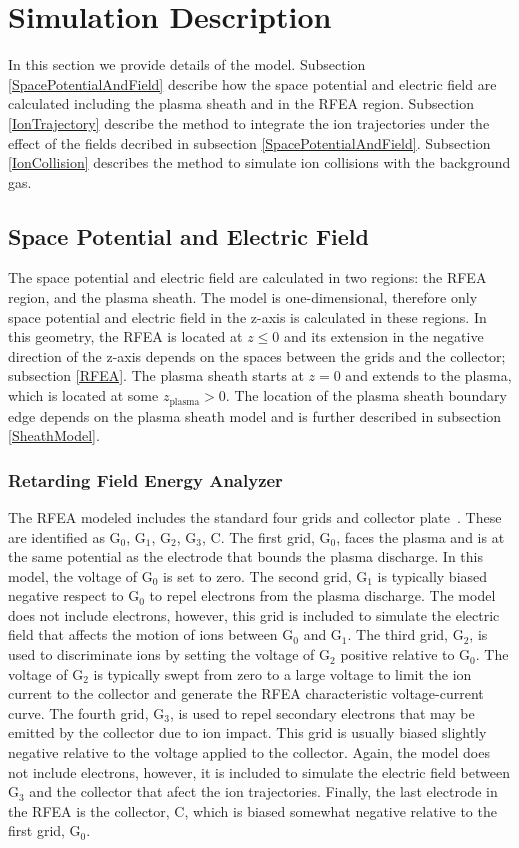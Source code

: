 \section{\label{Simulation}Simulation Description}
In this section we provide details of the model. Subsection \ref{SpacePotentialAndField} describe how the space potential and electric field are calculated including the plasma sheath and in the RFEA region. Subsection \ref{IonTrajectory} describe the method to integrate the ion trajectories under the effect of the fields decribed in subsection \ref{SpacePotentialAndField}. Subsection \ref{IonCollision} describes the method to simulate ion collisions with the background gas. 

\subsection{\label{SpacePotentialAndField}Space Potential and Electric Field}
The space potential and electric field are calculated in two regions: the RFEA region, and the plasma sheath. The model is one-dimensional, therefore only space potential and electric field in the z-axis is calculated in these regions. In this geometry, the RFEA is located at $z \leq 0$ and its extension in the negative direction of the z-axis depends on the spaces between the grids and the collector; subsection \ref{RFEA}. The plasma sheath starts at $z=0$ and extends to the plasma, which is located at some $z_\text{plasma} > 0$. The location of the plasma sheath boundary edge depends on the plasma sheath model and is further described in subsection \ref{SheathModel}.   

\subsubsection{\label{RFEA}Retarding Field Energy Analyzer}
The RFEA modeled includes the standard four grids and collector plate~\cite{Hutchinson1987}. These are identified as G$_0$, G$_1$, G$_2$, G$_3$, C. The first grid, G$_0$, faces the plasma and is at the same potential as the electrode that bounds the plasma discharge. In this model, the voltage of G$_0$ is set to zero. The second grid, G$_1$ is typically biased negative respect to G$_0$ to repel electrons from the plasma discharge. The model does not include electrons, however, this grid is included to simulate the electric field that affects the motion of ions between G$_0$ and G$_1$. The third grid, G$_2$, is used to discriminate ions by setting the voltage of G$_2$ positive relative to G$_0$. The voltage of G$_2$ is typically swept from zero to a large voltage to limit the ion current to the collector and generate the RFEA characteristic voltage-current curve. The fourth grid, G$_3$, is used to repel secondary electrons that may be emitted by the collector due to ion impact. This grid is usually biased slightly negative relative to the voltage applied to the collector. Again, the model does not include electrons, however, it is included to simulate the electric field between G$_3$ and the collector that afect the ion trajectories. Finally, the last electrode in the RFEA is the collector, C, which is biased somewhat negative relative to the first grid, G$_0$.

